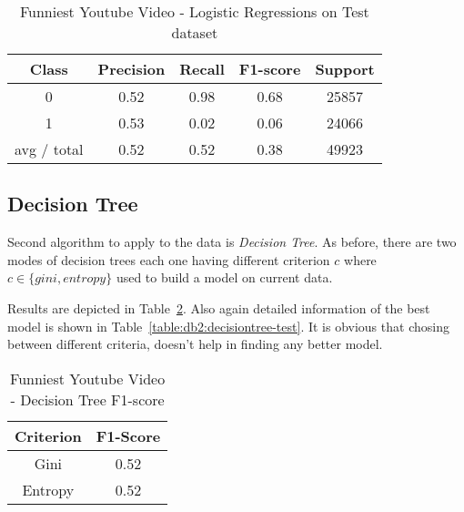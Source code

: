 \begin{table}[p]
\begin{center}
\begin{tabular}{|c|c|c|c|c|}
\hline Class & Precision & Recall & F1-score & Support \\

\hline 0 & 0.52 & 0.98 & 0.68 & 25857\\
\hline 1 & 0.53 & 0.02 & 0.06 & 24066\\
\hline avg / total & 0.52 & 0.52 & 0.38 & 49923\\
\hline
\end{tabular}

\caption{Funniest Youtube Video - Logistic Regressions on Test dataset}
\label{table:ds3:logisticregression-test}
\end{center}
\end{table}

\subsection{Decision Tree}

Second algorithm to apply to the data is {\it Decision Tree}. As before, there
are two modes of decision trees each one having different criterion $c$ where
$ c \in\{ gini,entropy\}$ used to build a model on current data.

Results are depicted in Table~\ref{table:ds3:decisiontree}. Also again detailed
information of the best model is shown in
Table~\ref{table:db2:decisiontree-test}. It is obvious that chosing between
different criteria, doesn't help in finding any better model.

\begin{table}[p]
\begin{center}
\begin{tabular}{|c|c|}
\hline Criterion & F1-Score \\

\hline Gini & 0.52 \\

\hline Entropy & 0.52 \\

\hline
\end{tabular}

\caption{Funniest Youtube Video - Decision Tree F1-score}
\label{table:ds3:decisiontree}
\end{center}
\end{table}



